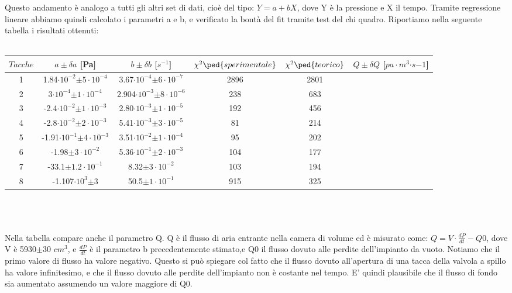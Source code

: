 \documentclass[11pt]{article}
\begin{document}
Questo andamento è analogo a tutti gli altri set di dati, cioè del tipo: $Y=a+bX$, dove Y è la pressione e X il tempo. Tramite regressione lineare abbiamo quindi calcolato i parametri a e b, e verificato la bontà del fit tramite test del chi quadro. Riportiamo nella seguente tabella i risultati ottenuti:\\
\vspace{10 px}\\
\begin{tabular}{|c|c|c|c|c|c|}
\hline $Tacche$ & $a\pm$$\delta a$ [Pa] & $b\pm$$\delta b$ [$s^{-1}$] & $\chi^{2}\ped{sperimentale}$ & $\chi^{2}\ped{teorico}$ & $Q\pm\delta Q$ [$pa\cdot m^{3}$$\cdot s{-1}$] \\ 
\hline 1 & 1.84$\cdot10^{-2}$$\pm 5\cdot10^{-4}$ &  3.67$\cdot10^{-4}$$\pm 6\cdot10^{-7}$ & 2896 & 2801 &  \\ 
\hline 2 & 3$\cdot10^{-4}$$\pm 1\cdot10^{-4}$ & 2.904$\cdot10^{-3}$$\pm 8\cdot10^{-6}$ & 238 & 683 &  \\ 
\hline 3 & -2.4$\cdot10^{-2}$$\pm 1\cdot10^{-3}$ &  2.80$\cdot10^{-3}$$\pm 1\cdot10^{-5}$ & 192 & 456 &  \\ 
\hline 4 & -2.8$\cdot10^{-2}$$\pm 2\cdot10^{-3}$ &  5.41$\cdot10^{-3}$$\pm 3\cdot10^{-5}$ & 81 & 214 &  \\ 
\hline 5 & -1.91$\cdot10^{-1}$$\pm 4\cdot10^{-3}$ & 3.51$\cdot10^{-2}$$\pm 1\cdot10^{-4}$ & 95 & 202 &  \\ 
\hline 6 & -1.98$\pm 3\cdot10^{-2}$  & 5.36$\cdot10^{-1}$$\pm 2\cdot10^{-3}$ & 104 & 177 &  \\ 
\hline 7 & -33.1$\pm 1.2\cdot10^{-1}$ & 8.32$\pm 3\cdot10^{-2}$ & 103 & 194 &  \\ 
\hline 8 & -1.107$\cdot10^{3}$$\pm 3$ & 50.5$\pm 1\cdot10^{-1}$  & 915 & 325 &  \\ 
\hline 
\end{tabular} \\
\\
\\
Nella tabella compare anche il parametro Q. Q è il flusso di aria entrante nella camera di volume ed è misurato come:
$Q=V\cdot \frac{dP}{dt}-Q0$, dove V è 5930$\pm 30$ $cm^{3}$, e $\frac{dP}{dt}$ è il parametro b precedentemente stimato,e Q0 il flusso dovuto alle perdite dell'impianto da vuoto.  Notiamo che il primo valore di flusso ha valore negativo. Questo si può spiegare col fatto che il flusso dovuto all'apertura di una tacca della valvola a spillo ha valore infinitesimo, e che il flusso dovuto alle perdite dell'impianto non è costante nel tempo. E' quindi plausibile che il flusso di fondo sia aumentato assumendo un valore maggiore di Q0.
\end{document}
